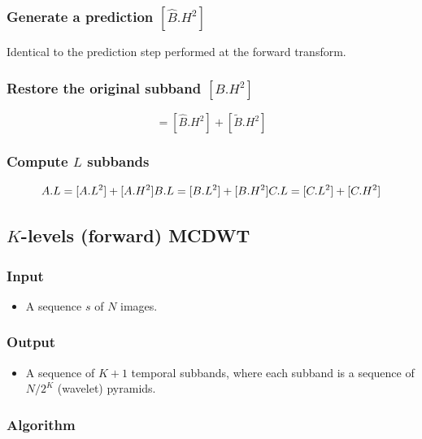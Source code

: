 {\subsubsection{Generate a prediction \([\hat{B}.H^2]\)}
Identical to the prediction step performed at the forward transform.

\subsubsection{Restore the original subband \([B.H^2]\)}
\begin{equation}
  [B.H^2] = [\hat{B}.H^2] + [\tilde{B}.H^2]
\end{equation}

\subsubsection{Compute \(L\) subbands}
\begin{equation}
  A.L = [A.L^2] + [A.H^2]\\
  B.L = [B.L^2] + [B.H^2]\\
  C.L = [C.L^2] + [C.H^2]
\end{equation}

\subsection{\(K\)-levels (forward) MCDWT}
\subsubsection{Input}
\begin{itemize}
\tightlist
\item
  A sequence \(s\) of \(N\) images.
\end{itemize}

\subsubsection{Output}
\begin{itemize}
\tightlist
\item
  A sequence of \(K+1\) temporal subbands, where each subband is a
  sequence of \(N/2^K\) (wavelet) pyramids.
\end{itemize}

\subsubsection{Algorithm}

}
